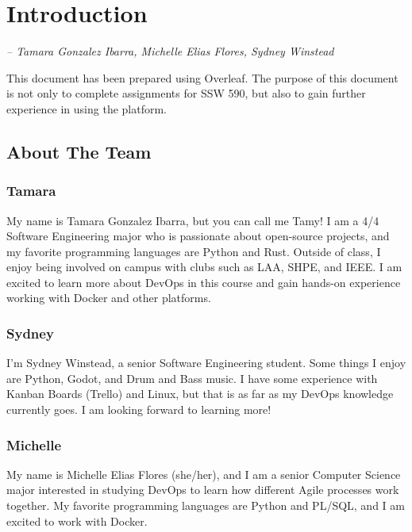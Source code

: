 \chapter{Introduction}
\label{Chapter::Introduction}

\begin{flushleft}
\small{\textit{-- Tamara Gonzalez Ibarra, Michelle Elias Flores, Sydney Winstead}}
\end{flushleft}

This document has been prepared using Overleaf. The purpose of this document is not only to complete assignments for SSW 590, but also to gain further experience in using the platform.

\section{About The Team}

\subsection{Tamara}
My name is Tamara Gonzalez Ibarra, but you can call me Tamy! I am a 4/4 Software Engineering major who is passionate about open-source projects, and my favorite programming languages are Python and Rust. Outside of class, I enjoy being involved on campus with clubs such as LAA, SHPE, and IEEE. I am excited to learn more about DevOps in this course and gain hands-on experience working with Docker and other platforms. 

\subsection{Sydney}
I'm Sydney Winstead, a senior Software Engineering student. Some things I enjoy are Python, Godot, and Drum and Bass music. I have some experience with Kanban Boards (Trello) and Linux, but that is as far as my DevOps knowledge currently goes. I am looking forward to learning more!

\subsection{Michelle}
My name is Michelle Elias Flores (she/her), and I am a senior Computer Science major interested in studying DevOps to learn how different Agile processes work together. My favorite programming languages are Python and PL/SQL, and I am excited to work with Docker.
